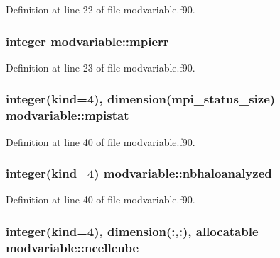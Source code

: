 Definition at line 22 of file modvariable.\+f90.

\subsubsection[{\texorpdfstring{mpierr}{mpierr}}]{\setlength{\rightskip}{0pt plus 5cm}integer modvariable\+::mpierr}\hypertarget{namespacemodvariable_a85886f33027f4edc9331bd9ada689d22}{}\label{namespacemodvariable_a85886f33027f4edc9331bd9ada689d22}


Definition at line 23 of file modvariable.\+f90.

\subsubsection[{\texorpdfstring{mpistat}{mpistat}}]{\setlength{\rightskip}{0pt plus 5cm}integer(kind=4), dimension(mpi\+\_\+status\+\_\+size) modvariable\+::mpistat}\hypertarget{namespacemodvariable_a9d7821389828ef466b9e1fcffd62dd76}{}\label{namespacemodvariable_a9d7821389828ef466b9e1fcffd62dd76}


Definition at line 40 of file modvariable.\+f90.

\subsubsection[{\texorpdfstring{nbhaloanalyzed}{nbhaloanalyzed}}]{\setlength{\rightskip}{0pt plus 5cm}integer(kind=4) modvariable\+::nbhaloanalyzed}\hypertarget{namespacemodvariable_ad881d35cf1a421a6a1c86b87c50c8810}{}\label{namespacemodvariable_ad881d35cf1a421a6a1c86b87c50c8810}


Definition at line 40 of file modvariable.\+f90.

\subsubsection[{\texorpdfstring{ncellcube}{ncellcube}}]{\setlength{\rightskip}{0pt plus 5cm}integer(kind=4), dimension(\+:,\+:), allocatable modvariable\+::ncellcube}\hypertarget{namespacemodvariable_a8bc6342027666b4dec0f7f417c754b55}{}\label{namespacemodvariable_a8bc6342027666b4dec0f7f417c754b55}


